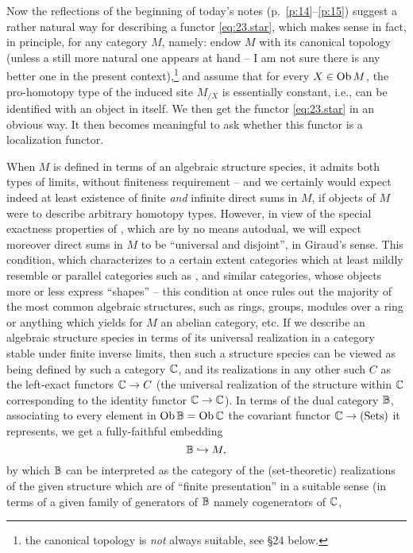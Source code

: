 Now the reflections of the beginning of today's notes
(p.~\ref{p:14}--\ref{p:15})
suggest a rather natural way for describing a functor
\eqref{eq:23.star}, which makes sense in fact, in principle, for any
category $M$, namely: endow $M$ with its canonical topology (unless a
still more natural one appears at hand -- I am not sure there is any
better one in the present context),\footnote{ the canonical
  topology is \emph{not} always suitable, see \S24 below.} and assume
that for every $X\in\operatorname{Ob} M$, the pro-homotopy type of the induced site
$M_{/X}$ is essentially constant, i.e., can be identified with an
object in \Hot{} itself. We then get the functor \eqref{eq:23.star} in
an obvious way. It then becomes meaningful to ask whether this functor
is a localization functor.

When $M$ is defined in terms of an algebraic structure species,
it admits both types of limits, without finiteness
requirement -- and we certainly would expect indeed at least existence
of finite \emph{and} infinite direct sums in $M$, if objects of $M$
were to describe arbitrary homotopy types. However, in view of the
special exactness properties of \Hot{}, which are by no means autodual,
we will expect moreover direct sums in $M$ to be ``universal and
disjoint'', in Giraud's sense. This condition, which characterizes to
a certain extent categories which at least mildly resemble or parallel
categories such as \Sets, \Spaces{} and similar categories, whose
objects more or less express ``shapes'' -- this condition at once
rules out the majority of the most common algebraic structures, such
as rings, groups, modules over a ring or anything which yields for $M$
an abelian category, etc. If we describe an algebraic structure
species in terms of its universal realization in a category stable
under finite inverse limits, then such a structure species can be
viewed as being defined by such a category ${\mathbb{C}}$, and its
realizations in any other such $C$ as the left-exact functors ${\mathbb{C}}\to C$
(the universal realization of the structure within ${\mathbb{C}}$
corresponding to the identity functor ${\mathbb{C}}\to {\ensuremath{\mathbb{C}}}$). In terms of
the dual category ${\mathbb{B}}$, associating to every element in $\operatorname{Ob}{{\mathbb{B}}}
= \operatorname{Ob}{{\mathbb{C}}}$ the covariant functor ${\mathbb{C}}\to{\ensuremath{(\mathrm{Sets})}}$ it
represents, we get a fully-faithful embedding
\[{\mathbb{B}}\hookrightarrow M,  \]
by which ${\mathbb{B}}$ can be interpreted as the category of the
(set-theoretic) realizations of the given structure which are of
``finite presentation'' in a suitable sense (in terms of a given
family of generators of ${\mathbb{B}}$ namely cogenerators of ${\mathbb{C}}$,

